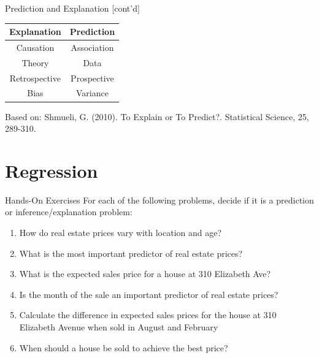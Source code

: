 \documentclass[ignorenonframetext,xcolor=x11names]{beamer}
\begin{document}
\begin{frame}{Prediction and Explanation \small [cont'd]}
\begin{center}
\renewcommand{\arraystretch}{1.25}

\begin{tabular}{c|c} \hline
\textbf{Explanation} & \textbf{Prediction} \\ \hline
Causation & Association \\
Theory & Data \\
Retrospective & Prospective \\
Bias & Variance \\ \hline
\end{tabular}
\end{center}
\vspace{5mm}
\small{Based on: Shmueli, G. (2010). To Explain or To Predict?. Statistical Science, 25, 289-310.}
\end{frame}

\section{Regression}

\begin{frame}{Hands-On Exercises}
For each of the following problems, decide if it is a prediction or inference/explanation problem:
\begin{enumerate}
   \item How do real estate prices vary with location and age?
   \item What is the most important predictor of real estate prices?
   \item What is the expected sales price for a house at 310 Elizabeth Ave?
   \item Is the month of the sale an important predictor of real estate prices?
   \item Calculate the difference in expected sales prices for the house at 310 Elizabeth Avenue when sold in August and February
   \item When should a house be sold to achieve the best price?
\end{enumerate}
\end{frame}
\end{document}
